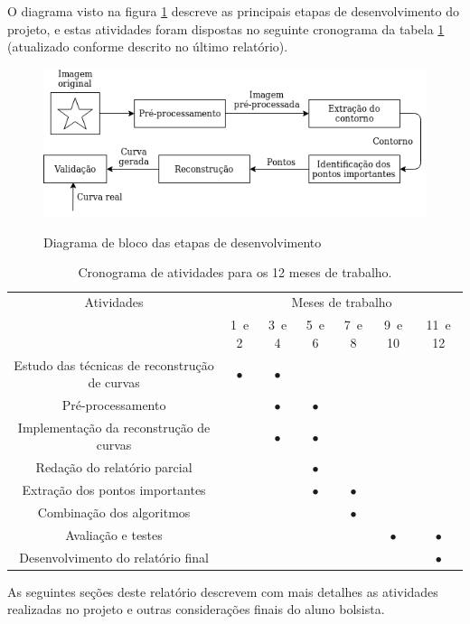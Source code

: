 O diagrama visto na figura \ref{fig:diagrama} descreve as principais etapas de desenvolvimento do projeto, e estas atividades foram dispostas no seguinte cronograma da tabela \ref{tab:cronograma} (atualizado conforme descrito no último relatório).

\begin{figure}[htb]
	\centering
	\caption{Diagrama de bloco das etapas de desenvolvimento}
	\includegraphics[width=.7\linewidth]{./img/diagrama.png}
	\label{fig:diagrama}
\end{figure}

\begin{table}[htb]
	\footnotesize
	\centering
	\vspace{0.5em}
	\setlength{\tabcolsep}{0.05in}
	\begin{tabular}{|c|c|c|c|c|c|c|}
		\hline
		Atividades
		& \multicolumn{6}{c|}{Meses de trabalho} \\
		\cline{2-7}
		& 1\textordmasculine\ e 2\textordmasculine & 3\textordmasculine\  e 4\textordmasculine & 5\textordmasculine\  e 6\textordmasculine & 7\textordmasculine\  e 8\textordmasculine & 9\textordmasculine\  e 10\textordmasculine & 11\textordmasculine\  e 12\textordmasculine \\ \hline
		
		Estudo das técnicas de reconstrução de curvas  & $\bullet$ & $\bullet$ & & & &\\ \hline
		
		Pré-processamento & & $\bullet$ & $\bullet$ & & & \\ \hline
		
		Implementação da reconstrução de curvas & & $\bullet$ & $\bullet$ & & & \\ \hline
		
		Redação do relatório parcial & & & $\bullet$ & & & \\ \hline
		
		Extração dos pontos importantes & & & $\bullet$ & $\bullet$ & & \\ \hline
		
		Combinação dos algoritmos & & & & $\bullet$ & & \\ \hline
		
		Avaliação e testes & & & & & $\bullet$ & $\bullet$ \\ \hline
		
		Desenvolvimento do relatório final & & & & & & $\bullet$ \\ \hline
		
	\end{tabular}
	\caption{Cronograma de atividades para os 12 meses de trabalho.}
	\label{tab:cronograma}
\end{table}

As seguintes seções deste relatório descrevem com mais detalhes as atividades realizadas no projeto e outras considerações finais do aluno bolsista.